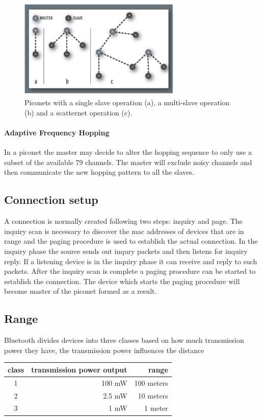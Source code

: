 \begin{figure}[h!]
  \centering
  \includegraphics[width=0.7\textwidth]{img/piconets.jpg} 
  \caption{Piconets with a single slave operation (a), a multi-slave operation (b) and a scatternet operation (c).}
\end{figure}

\paragraph{Adaptive Frequency Hopping}
In a piconet the master may decide to alter the hopping sequence to only use a subset of the available 79 channels. The master will exclude  noisy channels and then communicate the new hopping pattern to all the slaves.

\subsection{Connection setup}
A connection is normally created following two steps: inquiry and page.
The inquiry scan is necessary to discover the mac addresses of devices that are in range and the paging procedure is used to establish the actual connection.
In the inquiry phase the source sends out inqury packets and then listens for inquiry reply.
If a listening device is in the inquiry phase it can receive and reply to such packets.
After the inquiry scan is complete a paging procedure can be started to establish the connection.
The device which starts the paging procedure will become master of the piconet formed as a result.

\subsection{Range}
Bluetooth divides devices into three classes based on how much transmission power they have, the transmission power influences the distance 

\vspace{0.3cm}
\begin{tabular}{|c|r|r|}
 \hline
 class & transmission power output & range \\ \hline
 1 & 100 mW & 100 meters \\
 2 & 2.5 mW & 10 meters \\
 3 & 1 mW & 1 meter \\
 \hline
\end{tabular}
\vspace{0.3cm} 

